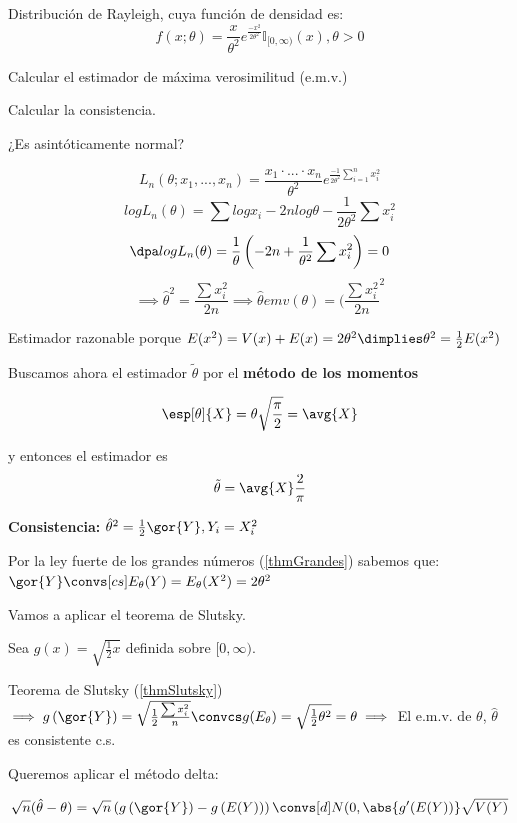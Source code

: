 \begin{problem}[5]
Distribución de Rayleigh, cuya función de densidad es:
\[f(x;\theta) = \frac{x}{\theta^2} e^{\frac{-x^2}{2\theta^2}} \mathbb{I}_{[0,\infty)} (x), \theta > 0\]

\ppart Calcular el estimador de máxima verosimilitud (e.m.v.)

\ppart Calcular la consistencia.

\ppart ¿Es asintóticamente normal?

\solution

\spart

\[L_n(\theta;x_1,...,x_n) = \frac{x_1 \cdot ... \cdot x_n}{\theta^2} e^{\frac{-1}{2\theta^2} \sum_{i=1}^n x_i^2}\]
\[log L_n(\theta) = \sum log x_i - 2nlog\theta -\frac{1}{2\theta^2}\sum x_i^2\]
\[\dpa log L_n(\theta) = \frac{1}{\theta} \left(-2n+\frac{1}{\theta^2}\sum x_i^2\right) = 0\]
\[\implies \hat{\theta}^2 = \frac{\sum x_i^2}{2n} \implies \hat{\theta} emv(\theta) = (\frac{\sum x_i^2}{2n}^2\]

Estimador razonable porque $E(x^2) = V(x) + E(x) = 2\theta^2 \dimplies \theta^2 = \frac{1}{2} E(x^2)$

Buscamos ahora el estimador $\tilde\theta$ por el \textbf{método de los momentos}

\[ \esp[\theta]{X}= \theta\sqrt{\frac{\pi}{2}} = \avg{X} \] 

y entonces el estimador es \[\tilde{\theta} = \avg{X}\frac{2}{\pi} \]

\spart

\textbf{Consistencia:} $\hat{\theta}^2 = \frac{1}{2} \gor{Y}, Y_i = X_i^2$

Por la ley fuerte de los grandes números (\ref{thmGrandes}) sabemos que: $\gor{Y} \convs[cs] E_{\theta}(Y) = E_{\theta}(X^2) = 2\theta^2$

Vamos a aplicar el teorema de Slutsky.

Sea $g(x) = \sqrt{\frac{1}{2}x}$ definida sobre $[0,\infty)$.

Teorema de Slutsky (\ref{thmSlutsky}) $\implies g\left(\gor{Y}\right) = \sqrt{\frac{1}{2} \frac{\sum x_i^2}{n}} \convcs g(E_{\theta}) = \sqrt{\frac{1}{2}\theta^2} = \theta \implies $ El e.m.v. de $\theta$, $\hat{\theta}$ es consistente c.s.


\spart

Queremos aplicar el método delta:

\[\sqrt{n}(\hat{\theta} - \theta) = \sqrt{n}\left(g\left(\gor{Y}\right) - g\left(E(Y)\right)\right) \convs[d]N(0,\abs{g'(E(Y))}\sqrt{V(Y)}\]


\end{problem}
